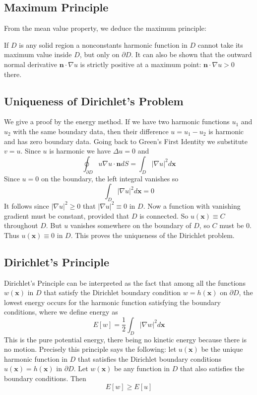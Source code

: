 \documentclass[12pt, a4paper, oneside, openright, titlepage]{book}
\begin{document}
\subsection{Maximum Principle}
From the mean value property, we deduce the maximum principle:

If $D$ is any solid region a nonconstants harmonic function in $D$ cannot take its maximum value inside $D$, but only on $\partial D$. It can also be shown that the outward normal derivative $\mathbf{n}\cdot \nabla u$ is strictly positive at a maximum point: $\mathbf{n}\cdot \nabla u > 0$ there. 

\subsection{Uniqueness of Dirichlet's Problem}

We give a proof by the energy method. If we have two harmonic functions $u_1$ and $u_2$ with the same boundary data, then their difference $u = u_1 - u_2$ is harmonic and has zero boundary data. Going back to Green's First Identity we substitute $v = u$. Since $u$ is harmonic we have $\Delta u = 0$ and \begin{equation*}
    \oint_{\partial D}u\nabla u \cdot \mathbf{n}dS = \int_D|\nabla u|^2d\mathbf{x}
\end{equation*}
Since $u = 0$ on the boundary, the left integral vanishes so $$\int_D|\nabla u|^2d\mathbf{x} = 0$$ It follows since $|\nabla u|^2 \geq 0$ that $|\nabla u|^2 \equiv 0$ in $D$. Now a function with vanishing gradient must be constant, provided that $D$ is connected. So $u(\mathbf{x}) \equiv C$ throughout $D$. But $u$ vanishes somewhere on the boundary of $D$, so $C$ must be $0$. Thus $u(\mathbf{x}) \equiv 0$ in $D$. This proves the uniqueness of the Dirichlet problem.

\subsection{Dirichlet's Principle}

Dirichlet's Principle can be interpreted as the fact that among all the functions $w(\mathbf{x})$ in $D$ that satisfy the Dirichlet boundary condition $w = h(\mathbf{x})$ on $\partial D$, the lowest energy occurs for the harmonic function satisfying the boundary conditions, where we define energy as \begin{equation*}
    E[w] = \frac{1}{2}\int_D|\nabla w|^2d\mathbf{x}
\end{equation*}
This is the pure potential energy, there being no kinetic energy because there is no motion. Precisely this principle says the following: let $u(\mathbf{x})$ be the unique harmonic function in $D$ that satisfies the Dirichlet boundary conditions $u(\mathbf{x}) = h(\mathbf{x})$ in $\partial D$. Let $w(\mathbf{x})$ be any function in $D$ that also satisfies the boundary conditions. Then\begin{equation*}
    E[w] \geq E[u]
\end{equation*}
\end{document}
